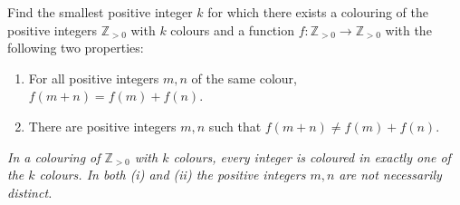 Find the smallest positive integer $k$ for which there exists a colouring of the positive integers $\mathbb{Z}_{>0}$ with $k$ colours and a function $f:\mathbb{Z}_{>0}\to \mathbb{Z}_{>0}$ with the following two properties:

\begin{enumerate}[label=(\roman*)]
	\item For all positive integers $m,n$ of the same colour, $f(m+n)=f(m)+f(n)$.
	\item There are positive integers $m,n$ such that $f(m+n)\ne f(m)+f(n)$.
\end{enumerate}

\emph{In a colouring of $\mathbb{Z}_{>0}$ with $k$ colours, every integer is coloured in exactly one of the $k$ colours. In both (i) and (ii) the positive integers $m,n$ are not necessarily distinct.}